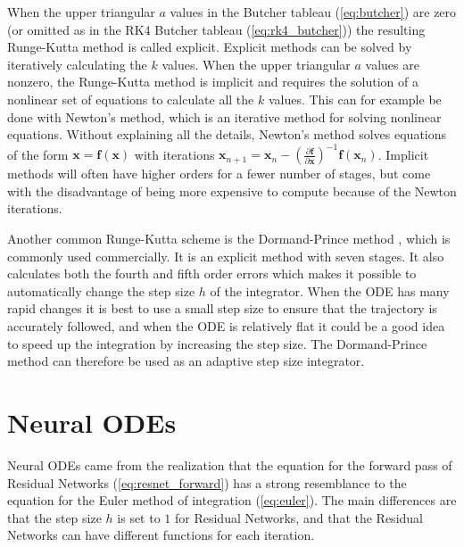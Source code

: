 \documentclass[12pt,a4paper]{book}
\begin{document}
When the upper triangular $a$ values in the Butcher tableau (\ref{eq:butcher}) are zero (or omitted as in the RK4 Butcher tableau (\ref{eq:rk4_butcher})) the resulting Runge-Kutta method is called explicit. Explicit methods can be solved by iteratively calculating the $k$ values. When the upper triangular $a$ values are nonzero, the Runge-Kutta method is implicit and requires the solution of a nonlinear set of equations to calculate all the $k$ values. This can for example be done with Newton's method, which is an iterative method for solving nonlinear equations. Without explaining all the details, Newton's method solves equations of the form $\bm{x} = \bm{f}(\bm{x})$ with iterations $\bm{x}_{n+1} = \bm{x}_n - (\frac{\partial \bm{f}}{\partial \bm{x}})^{-1} \bm{f}(\bm{x}_n)$. Implicit methods will often have higher orders for a fewer number of stages, but come with the disadvantage of being more expensive to compute because of the Newton iterations.

Another common Runge-Kutta scheme is the Dormand-Prince method \citep{dopri}, which is commonly used commercially. It is an explicit method with seven stages. It also calculates both the fourth and fifth order errors which makes it possible to automatically change the step size $h$ of the integrator. When the ODE has many rapid changes it is best to use a small step size to ensure that the trajectory is accurately followed, and when the ODE is relatively flat it could be a good idea to speed up the integration by increasing the step size. The Dormand-Prince method can therefore be used as an adaptive step size integrator.

\section{Neural ODEs}
\label{sec:node}

Neural ODEs came from the realization that the equation for the forward pass of Residual Networks (\ref{eq:resnet_forward}) has a strong resemblance to the equation for the Euler method of integration (\ref{eq:euler}). The main differences are that the step size $h$ is set to $1$ for Residual Networks, and that the Residual Networks can have different functions for each iteration.
\end{document}
